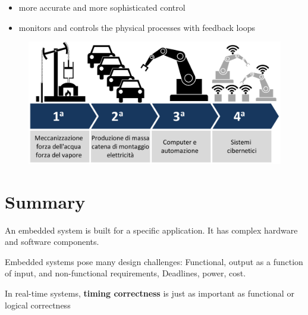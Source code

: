 \begin{itemize}
    \item more accurate and more sophisticated control
    \item monitors and controls the physical processes with feedback loops
\end{itemize}

\begin{figure}[H]
    \centering
    \includegraphics[width=0.5\linewidth]{img/Industry_4.0_ita.png}
\end{figure}

\section{Summary}

An embedded system is built for a specific application. It has complex hardware and software components.


Embedded systems pose many design challenges: Functional, output as a function of input, and non-functional requirements, Deadlines, power, cost.

In real-time systems, \textbf{timing correctness} is just as important as functional
or logical correctness